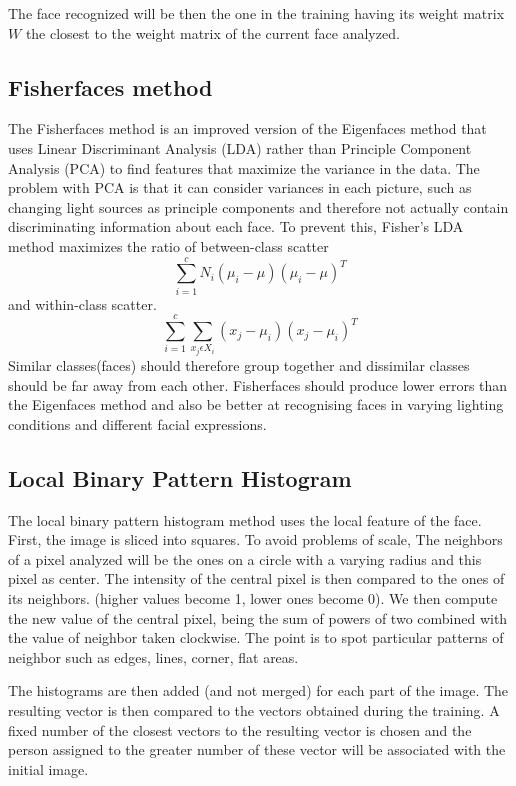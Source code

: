 The face recognized will be then the one in the training having its weight matrix $W$ the closest to the weight matrix of the current face analyzed. 

\subsection{Fisherfaces method}

The Fisherfaces method is an improved version of the Eigenfaces method that uses Linear Discriminant Analysis (LDA) rather than Principle Component Analysis (PCA) to find features that maximize the variance in the data. The problem with PCA is that it can consider variances in each picture, such as changing light sources as principle components and therefore not actually contain discriminating information about each face. To prevent this, Fisher's LDA method maximizes the ratio of between-class scatter 
\begin{equation}
	\sum\limits_{i=1}^{c}N_{i}(\mu_{i}-\mu)(\mu_{i}-\mu)^T
\end{equation}
and within-class scatter.
\begin{equation}
	\sum\limits_{i=1}^{c}\sum\limits_{x_{j}\epsilon X_{i}}^{}(x_{j}-\mu_{i})(x_{j}-\mu_{i})^T
\end{equation}
Similar classes(faces) should therefore group together and dissimilar classes should be far away from each other.
Fisherfaces should produce lower errors than the Eigenfaces method and also be better at recognising faces in varying lighting conditions and different facial expressions.\cite{Eigenfaces_vs_Fisherfaces}

\subsection{Local Binary Pattern Histogram}

The local binary pattern histogram method uses the local feature of the face. First, the image is sliced into squares.
To avoid problems of scale, The neighbors of a pixel analyzed will be the ones on a circle with a varying radius and this pixel as center.
The intensity of the central pixel is then compared to the ones of its neighbors. (higher values become 1, lower ones become 0).
We then compute the new value of the central pixel, being the sum of powers of two combined with the value of neighbor taken clockwise. The point is to spot particular patterns of neighbor such as edges, lines, corner, flat areas.


The histograms are then added (and not merged) for each part of the image. The resulting vector is then compared to the vectors obtained during the training. A fixed number of the closest vectors to the resulting vector is chosen and the person assigned to the greater number of these vector will be associated with the initial image.


